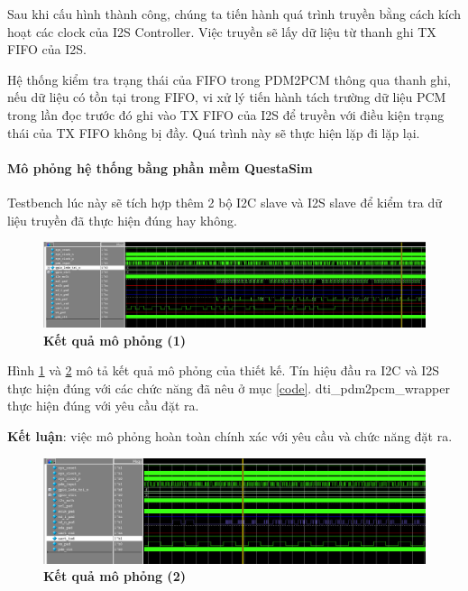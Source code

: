 Sau khi cấu hình thành công, chúng ta tiến hành quá trình truyền bằng cách kích hoạt các clock của I2S Controller. Việc truyền sẽ lấy dữ liệu từ thanh ghi TX FIFO của I2S.

Hệ thống kiểm tra trạng thái của FIFO trong PDM2PCM thông qua thanh ghi, nếu dữ liệu có tồn tại trong FIFO, vi xử lý tiến hành tách trường dữ liệu PCM trong lần đọc trước đó ghi vào TX FIFO của I2S để truyền với điều kiện trạng thái của TX FIFO không bị đầy. Quá trình này sẽ thực hiện lặp đi lặp lại.

\paragraph{Mô phỏng hệ thống bằng phần mềm QuestaSim}

Testbench lúc này sẽ tích hợp thêm 2 bộ I2C slave và I2S slave để kiểm tra dữ liệu truyền đã thực hiện đúng hay không. 
\begin{figure}[H]
    \centering
    \includegraphics[width=15cm]{Images/Chuong5/fpga/sim_1.png}
    \caption[Kết quả mô phỏng (1)]{\bfseries \fontsize{12pt}{0pt}\selectfont Kết quả mô phỏng (1)}
    \label{sim_1}
\end{figure}
Hình \ref{sim_1} và \ref{sim_2} mô tả kết quả mô phỏng của thiết kế. Tín hiệu đầu ra I2C và I2S thực hiện đúng với các chức năng đã nêu ở mục \ref{code}. dti\_pdm2pcm\_wrapper thực hiện đúng với yêu cầu đặt ra.

\textbf{Kết luận}: việc mô phỏng hoàn toàn chính xác với yêu cầu và chức năng đặt ra.

\begin{figure}[H]
    \centering
    \includegraphics[width=15cm]{Images/Chuong5/fpga/sim_2.png}
    \caption[Kết quả mô phỏng (2)]{\bfseries \fontsize{12pt}{0pt}\selectfont Kết quả mô phỏng (2)}
    \label{sim_2}
\end{figure}



